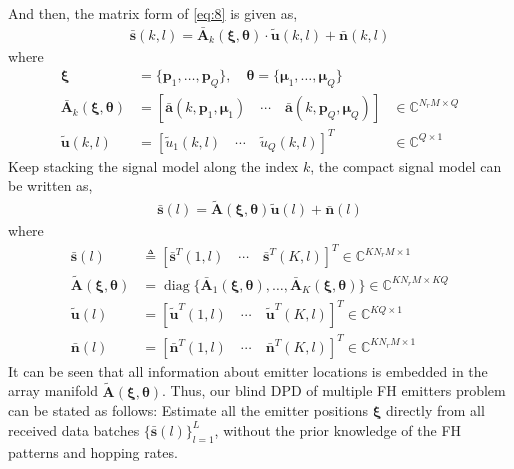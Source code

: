 \documentclass[journal,10pt]{IEEEtran}
\def \diag{\operatorname{diag}}
\begin{document}
And then, the matrix form of \eqref{eq:8} is given as,
\begin{align}\label{eq:11}
    \bar{\boldsymbol{s}}(k,l)= \bar{\boldsymbol{A}}_k(\boldsymbol{\xi},\boldsymbol{\theta}) \cdot \tilde{\boldsymbol{u}}(k,l)+\bar{\boldsymbol{n}}(k,l)
\end{align}
where
\begin{align*}  
    \boldsymbol{\xi}&=\{\boldsymbol{p}_1, \dots ,\boldsymbol{p}_Q\},\quad 
    \boldsymbol{\theta}=\{\boldsymbol{\mu}_{1},\dots ,\boldsymbol{\mu}_{Q}\}\\
    \bar{\boldsymbol{A}}_k(\boldsymbol{\xi},\boldsymbol{\theta})&=[\bar{\boldsymbol{a}}(k,\boldsymbol{p}_1,\boldsymbol{\mu}_{1})\quad \cdots \quad \bar{\boldsymbol{a}}(k,\boldsymbol{p}_Q,\boldsymbol{\mu}_{Q})] &\in \mathbb{C}^{N_rM\times Q}\\   
    \tilde{\boldsymbol{u}}(k,l)&=[\tilde{u}_1(k,l) \quad \cdots \quad \tilde{u}_Q(k,l)]^T &\in \mathbb{C}^{Q\times 1}  
\end{align*}
Keep stacking the signal model along the index $k$, the compact signal model can be written as,
\begin{align}\label{eq:12}
    \bar{\boldsymbol{s}}(l)=\tilde{\boldsymbol{A}}(\boldsymbol{\xi},\boldsymbol{\theta})\tilde{\boldsymbol{u}}(l)+\bar{\boldsymbol{n}}(l) 
\end{align}
where 
\begin{align*}
    \bar{\boldsymbol{s}}(l)&\triangleq[\bar{\boldsymbol{s}}^T(1,l)\quad  \cdots \quad \bar{\boldsymbol{s}}^T(K,l)]^T \in \mathbb{C}^{KN_rM\times 1 }\\
    \tilde{\boldsymbol{A}}(\boldsymbol{\xi},\boldsymbol{\theta})&=\diag \{\bar{\boldsymbol{A}}_1(\boldsymbol{\xi},\boldsymbol{\theta}),\dots,\bar{\boldsymbol{A}}_K(\boldsymbol{\xi},\boldsymbol{\theta})\} \in \mathbb{C}^{KN_rM\times KQ}\\
    \tilde{\boldsymbol{u}}(l)&=[\tilde{\boldsymbol{u}}^T(1,l) \quad \cdots \quad \tilde{\boldsymbol{u}}^T(K,l)]^T \in \mathbb{C}^{KQ\times 1}\\
    \bar{\boldsymbol{n}}(l)&=[\bar{\boldsymbol{n}}^T(1,l)\quad \cdots \quad \bar{\boldsymbol{n}}^T(K,l)]^T\in \mathbb{C}^{KN_rM\times 1 }
\end{align*}
It can be seen that all information about emitter locations is embedded in the array manifold  $\tilde{\boldsymbol{A}}(\boldsymbol{\xi},\boldsymbol{\theta})$.
Thus, our blind DPD of multiple FH emitters problem can be stated as follows: Estimate all the emitter positions  $\boldsymbol{\xi}$ directly from all received data batches $\lbrace\bar{\boldsymbol{s}}(l)\rbrace_{l=1}^{L}$,
without the prior knowledge of the FH patterns and hopping rates. 
\end{document}

